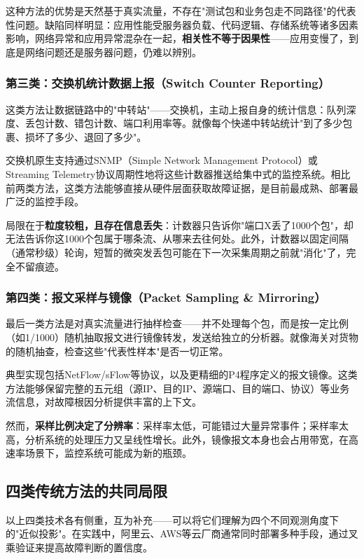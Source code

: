 这种方法的优势是天然基于真实流量，不存在"测试包和业务包走不同路径"的代表性问题。缺陷同样明显：应用性能受服务器负载、代码逻辑、存储系统等诸多因素影响，网络异常和应用异常混杂在一起，\textbf{相关性不等于因果性}——应用变慢了，到底是网络问题还是服务器问题，仍难以辨别。

\subsubsection{第三类：交换机统计数据上报（Switch Counter Reporting）}

这类方法让数据链路中的"中转站"——交换机，主动上报自身的统计信息：队列深度、丢包计数、错包计数、端口利用率等。就像每个快递中转站统计"到了多少包裹、损坏了多少、退回了多少"。

交换机原生支持通过SNMP（Simple Network Management Protocol）或Streaming Telemetry协议周期性地将这些计数器推送给集中式的监控系统。相比前两类方法，这类方法能够直接从硬件层面获取故障证据，是目前最成熟、部署最广泛的监控手段。

局限在于\textbf{粒度较粗，且存在信息丢失}：计数器只告诉你"端口X丢了1000个包"，却无法告诉你这1000个包属于哪条流、从哪来去往何处。此外，计数器以固定间隔（通常秒级）轮询，短暂的微突发丢包可能在下一次采集周期之前就"消化"了，完全不留痕迹。

\subsubsection{第四类：报文采样与镜像（Packet Sampling \& Mirroring）}

最后一类方法是对真实流量进行抽样检查——并不处理每个包，而是按一定比例（如1/1000）随机抽取报文进行镜像转发，发送给独立的分析器。就像海关对货物的随机抽查，检查这些"代表性样本"是否一切正常。

典型实现包括NetFlow/sFlow等协议，以及更精细的P4程序定义的报文镜像。这类方法能够保留完整的五元组（源IP、目的IP、源端口、目的端口、协议）等业务流信息，对故障根因分析提供丰富的上下文。

然而，\textbf{采样比例决定了分辨率}：采样率太低，可能错过大量异常事件；采样率太高，分析系统的处理压力又呈线性增长。此外，镜像报文本身也会占用带宽，在高速率场景下，监控系统可能成为新的瓶颈。

\subsection{四类传统方法的共同局限}

以上四类技术各有侧重，互为补充——可以将它们理解为四个不同观测角度下的"近似投影"。在实践中，阿里云、AWS等云厂商通常同时部署多种手段，通过叉乘验证来提高故障判断的置信度。


